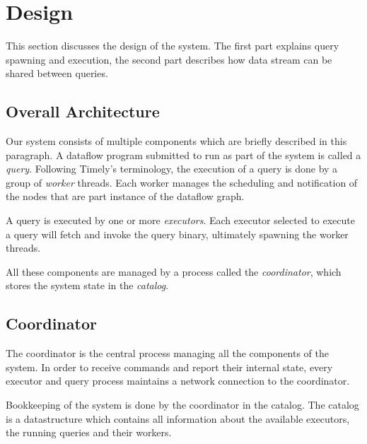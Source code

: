 \chapter{Design}\label{ch:design}

This section discusses the design of the system. The first part explains query
spawning and execution, the second part describes how data stream can be shared
between queries.

\section{Overall Architecture}

Our system consists of multiple components which are briefly described in this
paragraph. A dataflow program submitted to run as part of the system is
called a \emph{query}. Following Timely's terminology, the execution of a query
is done by a group of \emph{worker} threads. Each worker manages the scheduling and
notification of the nodes that are part instance of the dataflow graph. 

A query is executed by one or more \emph{executors}. Each executor selected to
execute a query will fetch and invoke the query binary, ultimately spawning the
worker threads. 

All these components are managed by a process called the \emph{coordinator},
which stores the system state in the \emph{catalog}.

\section{Coordinator}

The coordinator is the central process managing all the components
of the system. In order to receive commands and report their internal state,
every executor and query process maintains a network connection to the coordinator.

Bookkeeping of the system is done by the coordinator in the catalog. The
catalog is a datastructure which contains all information about the available
executors, the running queries and their workers. 

